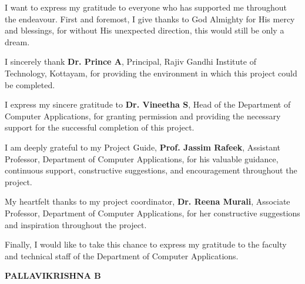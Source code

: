 \documentclass[12pt,a4paper]{report}
\begin{document}
\vspace{0.45cm}

\noindent
I want to express my gratitude to everyone who has supported me
throughout the endeavour. First and foremost, I give thanks to
God Almighty for His mercy and blessings, for without His
unexpected direction, this would still be only a dream.

\vspace{0.15cm}

\noindent
I sincerely thank \textbf{Dr. Prince A}, Principal, Rajiv Gandhi
Institute of Technology, Kottayam, for providing the environment
in which this project could be completed.

\vspace{0.15cm}

\noindent
I express my sincere gratitude to \textbf{Dr. Vineetha S}, Head
of the Department of Computer Applications, for granting
permission and providing the necessary support for the successful
completion of this project.

\vspace{0.15cm}

\noindent
I am deeply grateful to my Project Guide,
\textbf{Prof. Jassim Rafeek}, Assistant Professor, Department of
Computer Applications, for his valuable guidance, continuous
support, constructive suggestions, and encouragement throughout
the project.

\vspace{0.15cm}

\noindent
My heartfelt thanks to my project coordinator,
\textbf{Dr. Reena Murali}, Associate Professor, Department of
Computer Applications, for her constructive suggestions and
inspiration throughout the project.

\vspace{0.15cm}

\noindent
Finally, I would like to take this chance to express my gratitude
to the faculty and technical staff of the Department of Computer
Applications.

\vspace{1.2cm}

\begin{flushright}
    \textbf{PALLAVIKRISHNA B}
\end{flushright}


\newpage
\thispagestyle{empty}
\end{document}

